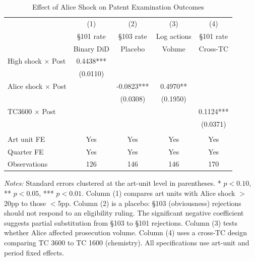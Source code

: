 \begin{table}[H]
\centering
\caption{Effect of Alice Shock on Patent Examination Outcomes}
\label{tab:main}
\begin{threeparttable}
\begin{tabular}{lcccc}
\toprule
 & (1) & (2) & (3) & (4) \\
 & \S101 rate & \S103 rate & Log actions & \S101 rate \\
 & Binary DiD & Placebo & Volume & Cross-TC \\
\midrule
High shock $\times$ Post & 0.4438*** & & & \\
 & (0.0110) & & & \\
Alice shock $\times$ Post & & -0.0823*** & 0.4970** & \\
 & & (0.0308) & (0.1950) & \\
TC3600 $\times$ Post & & & & 0.1124*** \\
 & & & & (0.0371) \\
\\
Art unit FE & Yes & Yes & Yes & Yes \\
Quarter FE & Yes & Yes & Yes & Yes \\
Observations & 126 & 146 & 146 & 170 \\
\bottomrule
\end{tabular}
\begin{tablenotes}[flushleft]
\small
\item \textit{Notes:} Standard errors clustered at the art-unit level in parentheses. * $p<0.10$, ** $p<0.05$, *** $p<0.01$. Column (1) compares art units with Alice shock $>$20pp to those $<$5pp. Column (2) is a placebo: \S103 (obviousness) rejections should not respond to an eligibility ruling. The significant negative coefficient suggests partial substitution from \S103 to \S101 rejections. Column (3) tests whether Alice affected prosecution volume. Column (4) uses a cross-TC design comparing TC 3600 to TC 1600 (chemistry). All specifications use art-unit and period fixed effects.
\end{tablenotes}
\end{threeparttable}
\end{table}
